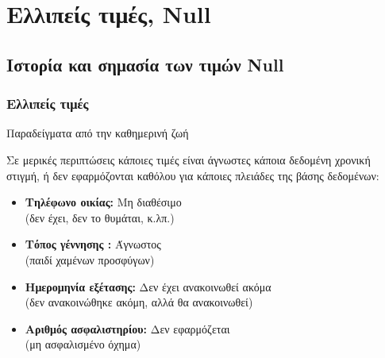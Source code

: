 \section[\textlatin{Null}] {\textgreek {Ελλιπείς τιμές}, \textlatin{Null} }

\subsection[\textlatin{history}] {\textgreek {Ιστορία και σημασία των τιμών} \textlatin{Null} }

\begin{frame}[t, fragile]
\frametitle{Ελλιπείς τιμές}
\begin{minipage}{\wE}
  \begin{exampleblock}{Παραδείγματα από την καθημερινή ζωή}
    \par Σε μερικές περιπτώσεις κάποιες τιμές είναι άγνωστες κάποια δεδομένη
         χρονική στιγμή, ή δεν εφαρμόζονται καθόλου για κάποιες πλειάδες της βάσης
         δεδομένων:
    \pause     
    \begin{itemize}
     \item {\bf Τηλέφωνο οικίας:} {\color{red} Μη διαθέσιμο} \\ (δεν έχει, δεν το θυμάται, κ.λπ.)
     \item {\bf Τόπος γέννησης :} {\color{red} Άγνωστος} \\ (παιδί χαμένων προσφύγων)
     \item {\bf Ημερομηνία εξέτασης:} {\color{red} Δεν έχει ανακοινωθεί ακόμα} \\
            (δεν ανακοινώθηκε ακόμη, αλλά θα ανακοινωθεί)
     \item {\bf Αριθμός ασφαλιστηρίου:} {\color{red} Δεν εφαρμόζεται} \\ (μη ασφαλισμένο όχημα)
    \end{itemize}
  \end{exampleblock}
\end{minipage}  
\end{frame}


